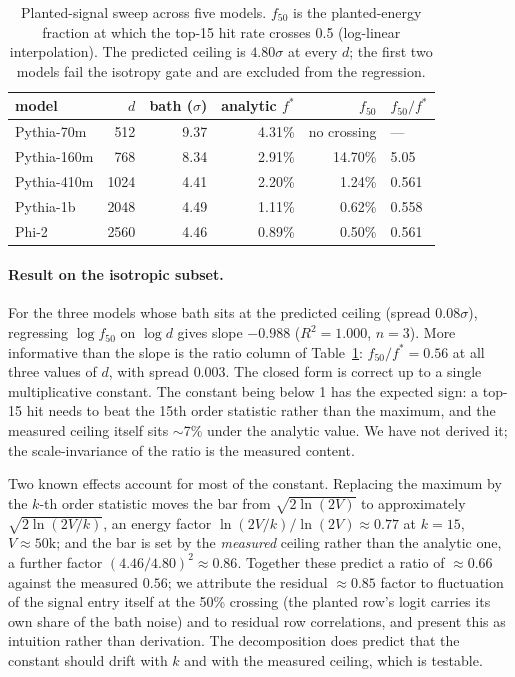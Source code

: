 \documentclass[11pt]{article}
\newcommand{\fstar}{f^{*}}
\begin{document}
\begin{table}[t]
\centering
\small
\begin{tabular}{lrrrrl}
\toprule
model & $d$ & bath ($\sigma$) & analytic $\fstar$ & $f_{50}$ &
$f_{50}/\fstar$ \\
\midrule
Pythia-70m & 512 & 9.37 & 4.31\% & no crossing & --- \\
Pythia-160m & 768 & 8.34 & 2.91\% & 14.70\% & 5.05 \\
Pythia-410m & 1024 & 4.41 & 2.20\% & 1.24\% & 0.561 \\
Pythia-1b & 2048 & 4.49 & 1.11\% & 0.62\% & 0.558 \\
Phi-2 & 2560 & 4.46 & 0.89\% & 0.50\% & 0.561 \\
\bottomrule
\end{tabular}
\caption{Planted-signal sweep across five models. $f_{50}$ is the
planted-energy fraction at which the top-15 hit rate crosses 0.5
(log-linear interpolation). The predicted ceiling is $4.80\sigma$ at
every $d$; the first two models fail the isotropy gate and are
excluded from the regression.}
\label{tab:scale}
\end{table}

\paragraph{Result on the isotropic subset.} For the three models
whose bath sits at the predicted ceiling (spread $0.08\sigma$),
regressing $\log f_{50}$ on $\log d$ gives slope $-0.988$
($R^2 = 1.000$, $n{=}3$). More informative than the slope is the
ratio column of Table~\ref{tab:scale}: $f_{50}/\fstar = 0.56$ at all
three values of $d$, with spread $0.003$. The closed form is correct
up to a single multiplicative constant. The constant being below 1
has the expected sign: a top-15 hit needs to beat the 15th order
statistic rather than the maximum, and the measured ceiling itself
sits $\sim$7\% under the analytic value. We have not derived
it; the scale-invariance of the ratio is the measured content.

Two known effects account for most of the constant. Replacing the
maximum by the $k$-th order statistic moves the bar from
$\sqrt{2\ln(2V)}$ to approximately $\sqrt{2\ln(2V/k)}$, an energy
factor $\ln(2V/k)/\ln(2V) \approx 0.77$ at $k{=}15$,
$V \approx 50\text{k}$; and the bar is set by the \emph{measured}
ceiling rather than the analytic one, a further factor
$(4.46/4.80)^2 \approx 0.86$. Together these predict a ratio of
$\approx 0.66$ against the measured $0.56$; we attribute the residual
$\approx 0.85$ factor to fluctuation of the signal entry itself at
the 50\% crossing (the planted row's logit carries its own share of
the bath noise) and to residual row correlations, and present this as
intuition rather than derivation. The decomposition does predict that
the constant should drift with $k$ and with the measured ceiling,
which is testable.
\end{document}
